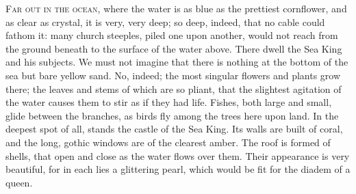 \textsc{Far out in the ocean}, where the water is as blue as the prettiest cornflower, and as clear as crystal, it is very, very deep; so deep, indeed, that no cable could fathom it: many church steeples, piled one upon another, would not reach from the ground beneath to the surface of the water above.
There dwell the Sea King and his subjects.
We must not imagine that there is nothing at the bottom of the sea but bare yellow sand.
No, indeed; the most singular flowers and plants grow there; the leaves and stems of which are so pliant, that the slightest agitation of the water causes them to stir as if they had life.
Fishes, both large and small, glide between the branches, as birds fly among the trees here upon land.
In the deepest spot of all, stands the castle of the Sea King.
Its walls are built of coral, and the long, gothic windows are of the clearest amber.
The roof is formed of shells, that open and close as the water flows over them.
Their appearance is very beautiful, for in each lies a glittering pearl, which would be fit for the diadem of a queen.

